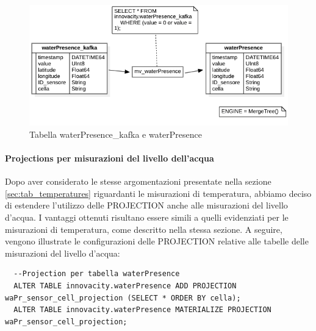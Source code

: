 \begin{figure}[H]
  \centering
  \includegraphics[width=1\textwidth]{../Images/SpecificaTecnica/waterPresence.png}
  \caption{Tabella waterPresence\_kafka e waterPresence}
  \label{fig:waterPresence_tables}
\end{figure}

\paragraph{Projections per misurazioni del livello dell'acqua} 
Dopo aver considerato le stesse argomentazioni presentate nella sezione \ref{sec:tab_temperatures} riguardanti le misurazioni di temperatura, abbiamo deciso di estendere l'utilizzo delle PROJECTION anche alle misurazioni del livello d'acqua. I vantaggi ottenuti risultano essere simili a quelli evidenziati per le misurazioni di temperatura, come descritto nella stessa sezione. A seguire, vengono illustrate le configurazioni delle PROJECTION relative alle tabelle delle misurazioni del livello d'acqua:
\begin{lstlisting}
  --Projection per tabella waterPresence
  ALTER TABLE innovacity.waterPresence ADD PROJECTION waPr_sensor_cell_projection (SELECT * ORDER BY cella);
  ALTER TABLE innovacity.waterPresence MATERIALIZE PROJECTION waPr_sensor_cell_projection;
\end{lstlisting}